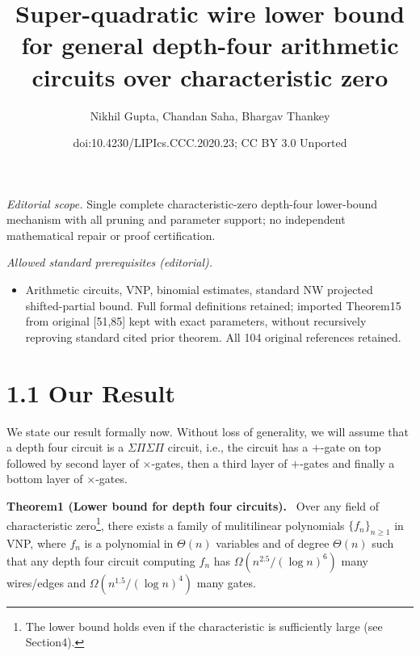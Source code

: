 \documentclass[10pt,a4paper]{article}
\title{Super-quadratic wire lower bound for general depth-four arithmetic circuits over characteristic zero}
\author{Nikhil Gupta, Chandan Saha, Bhargav Thankey}
\date{doi:10.4230/LIPIcs.CCC.2020.23; CC BY 3.0 Unported}
\newenvironment{authorclaim}[1]{\par\medskip\noindent\textbf{#1.}\ \ignorespaces}{\par\medskip}
\begin{document}
\maketitle
\noindent\textit{Editorial scope.} Single complete characteristic-zero depth-four lower-bound mechanism with all pruning and parameter support; no independent mathematical repair or proof certification.\par\medskip
\noindent\textit{Allowed standard prerequisites (editorial).}\begin{itemize}
\item Arithmetic circuits, VNP, binomial estimates, standard NW projected shifted-partial bound. Full formal definitions retained; imported Theorem15 from original [51,85] kept with exact parameters, without recursively reproving standard cited prior theorem. All 104 original references retained.
\end{itemize}\medskip
\section*{1.1 Our Result}
We state our result formally now. Without loss of generality, we will assume that a depth four circuit is a $\Sigma\Pi\Sigma\Pi$ circuit, i.e., the circuit has a $+$-gate on top followed by second layer of $\times$-gates, then a third layer of $+$-gates and finally a bottom layer of $\times$-gates.
\begin{authorclaim}{Theorem1 (Lower bound for depth four circuits)}
Over any field of characteristic zero\footnote{The lower bound holds even if the characteristic is sufficiently large (see Section4).}, there exists a family of mulitilinear polynomials $\{f_n\}_{n\ge1}$ in VNP, where $f_n$ is a polynomial in $\Theta(n)$ variables and of degree $\Theta(n)$ such that any depth four circuit computing $f_n$ has $\Omega(n^{2.5}/(\log n)^6)$ many wires/edges and $\Omega(n^{1.5}/(\log n)^4)$ many gates.
\end{authorclaim}
\end{document}
